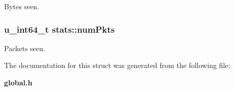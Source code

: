 Bytes seen. 

\subsubsection[{num\+Pkts}]{\setlength{\rightskip}{0pt plus 5cm}u\+\_\+int64\+\_\+t stats\+::num\+Pkts}\label{structstats_aacc726ac206535c7d3c75f73c484aee4}


Packets seen. 



The documentation for this struct was generated from the following file\+:\begin{DoxyCompactItemize}
\item 
{\bf global.\+h}\end{DoxyCompactItemize}
